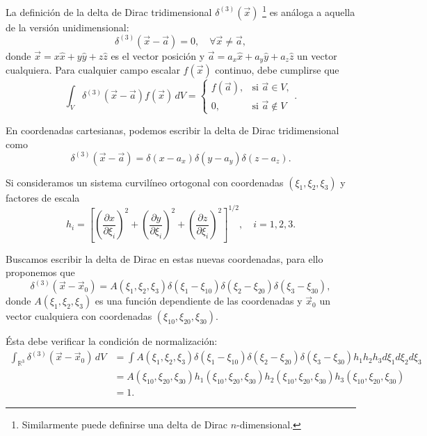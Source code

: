 La definición de la delta de Dirac tridimensional $\delta^{(3)}(\Vec{x})$ \footnote{Similarmente puede definirse una delta de Dirac $n$-dimensional.} es análoga a aquella de la versión unidimensional:
\begin{equation}
    \delta^{(3)}(\vec{x} - \vec{a}) = 0, \quad \forall \vec{x} \neq \vec{a},
\end{equation}
donde $\Vec{x} = x \hat{x} + y \hat{y} + z \hat{z}$ es el vector posición y $\vec{a} = a_x \hat{x} + a_y \hat{y} + a_z \hat{z}$ un vector cualquiera. Para cualquier campo escalar $f(\Vec{x})$ continuo, debe cumplirse que
\begin{equation}
    \int_{V} \delta^{(3)}(\vec{x} - \vec{a}) f(\vec{x}) \,dV = \left\{ \begin{array}{cl}
        f(\vec{a}), & \text{si $\vec{a} \in V$},  \\
        0, & \text{si $\vec{a} \notin V$}
    \end{array} \right. .
\end{equation}

En coordenadas cartesianas, podemos escribir la delta de Dirac tridimensional como
\begin{equation}
    \delta^{(3)}(\vec{x} - \vec{a}) = \delta(x - a_{x})\delta(y - a_{y})\delta(z - a_{z}).
\end{equation}

Si consideramos un sistema curvilíneo ortogonal con coordenadas $(\xi_1, \xi_2, \xi_3)$ y factores de escala
\begin{equation}
 h_i = \left[ \left(\frac{\partial x}{\partial \xi_i} \right)^2 + \left(\frac{\partial y}{\partial \xi_i}\right)^2 + \left(\frac{\partial z}{\partial \xi_i} \right)^2 \right]^{1/2}, \quad i = 1,2,3.   
\end{equation}

Buscamos escribir la delta de Dirac en estas nuevas coordenadas, para ello proponemos que
\begin{equation}
  \delta^{(3)}(\Vec{x} - \Vec{x}_0) = A(\xi_1, \xi_2, \xi_3) \delta(\xi_1 - \xi_{10})\delta(\xi_2 - \xi_{20})\delta(\xi_3 - \xi_{30}),  
\end{equation}
donde $A(\xi_1, \xi_2, \xi_3)$ es una función  dependiente de las coordenadas y $\vec{x}_0$ un vector cualquiera con coordenadas $(\xi_{10},\xi_{20},\xi_{30})$. 

Ésta debe verificar la condición de normalización:
\begin{align}
 \int_{\mathbb{R}^3} \delta^{(3)}(\Vec{x} - \Vec{x}_0) \, dV &= \int A(\xi_1, \xi_2, \xi_3) \delta(\xi_1 - \xi_{10})\delta(\xi_2 - \xi_{20})\delta(\xi_3 - \xi_{30})  h_1 h_2 h_3 d\xi_1 d\xi_2 d\xi_3 \nonumber\\
 &= A(\xi_{10}, \xi_{20},\xi_{30}) h_1(\xi_{10}, \xi_{20},\xi_{30}) h_2(\xi_{10}, \xi_{20},\xi_{30}) h_3(\xi_{10}, \xi_{20},\xi_{30}) \nonumber\\
 &= 1.   
\end{align}

